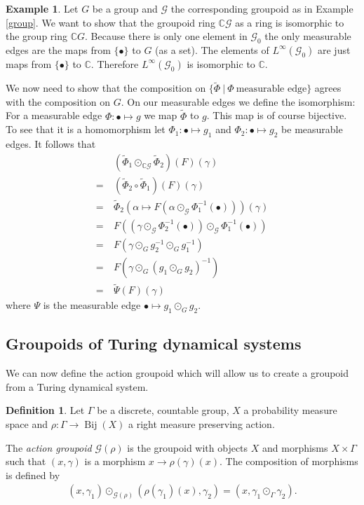 \documentclass[12pt,a4paper]{scrartcl}
\theoremstyle{plain}
\theoremstyle{definition}
\newtheorem{Definition}[Theorem]{Definition}
\newtheorem{Example}[Theorem]{Example}
\numberwithin{equation}{section}
\newcommand{\C}{\mathbb{C}} %
\newcommand{\2}{\mathbb{Z} / 2 \mathbb{Z}}
\newcommand{\G}{\mathcal{G}}
\newcommand{\1}{\bar{1}}
\newcommand{\0}{\bar{0}}
\newcommand{\Bij}{\operatorname{Bij}}
\begin{document}
\begin{Example} \label{groupoid_ring_of_groups}
	Let $G$ be a group and $\G$ the corresponding groupoid as in Example \ref{group}. We want to show that the groupoid ring $\C \G$ as a ring is isomorphic to the group ring $\C G$. Because there is only one element in $\G_0$ the only measurable edges are the maps from $\{\bullet\}$ to $G$ (as a set). The elements of $L^\infty(\G_0)$ are just maps from $\{\bullet \}$ to $\C$. Therefore  $L^\infty(\G_0)$ is isomorphic to $\C$. 
	
	We now need to show that the composition on $\{\tilde{\Phi}~|~ \Phi~\text{measurable edge}\}$ agrees with the composition on $G$.
	On our measurable edges we define the isomorphism: For a measurable edge $\Phi\colon\bullet \mapsto g$ we map $\tilde{\Phi}$ to $g$. This map is of course bijective. To see that it is a homomorphism let $\Phi_1\colon\bullet \mapsto g_1$ and $\Phi_2\colon\bullet \mapsto g_2$ be measurable edges. It follows that
	\begin{align*}
		  &~ (\tilde{\Phi}_1 \odot_{\C \G} \tilde{\Phi}_2)(F)(\gamma) \\
		= &~ (\tilde{\Phi}_2 \circ \tilde{\Phi}_1)(F)(\gamma) \\
		= &~ \tilde \Phi_2 (\alpha \mapsto F(\alpha \odot_{\G}\Phi_1^{-1}(\bullet)))(\gamma) \\
		= &~ F((\gamma \odot_{\G} \Phi_2^{-1}(\bullet)) \odot_{\G} \Phi_1^{-1}(\bullet)) \\
		= &~ F(\gamma \odot_G g_2^{-1} \odot_G g_1^{-1}) \\
		= &~ F(\gamma \odot_G (g_1 \odot_G g_2)^{-1}) \\
		= &~ \tilde{\Psi} (F)(\gamma)
	\end{align*}
	where $\Psi$ is the measurable edge $\bullet \mapsto g_1 \odot_G g_2$.
\end{Example}


\subsection{Groupoids of Turing dynamical systems}
We can now define the action groupoid which will allow us to create a groupoid from a Turing dynamical system.
\begin{Definition} \label{action_groupoid}
	Let $\Gamma$ be a discrete, countable group, $X$ a probability measure space and $\rho\colon\Gamma \to \Bij(X)$ a right measure preserving action.
	
	The \emph{action groupoid} $\G(\rho)$ is the groupoid with objects $X$ and morphisms $X \times \Gamma$ such that $(x,\gamma)$ is a morphism $x \to \rho(\gamma)(x)$. The composition of morphisms is defined by
	\begin{align*}
		(x, \gamma_1) \odot_{\G(\rho)} (\rho(\gamma_1) (x), \gamma_2) = (x, \gamma_1 \odot_\Gamma \gamma_2).
	\end{align*}
\end{Definition}
\end{document}
